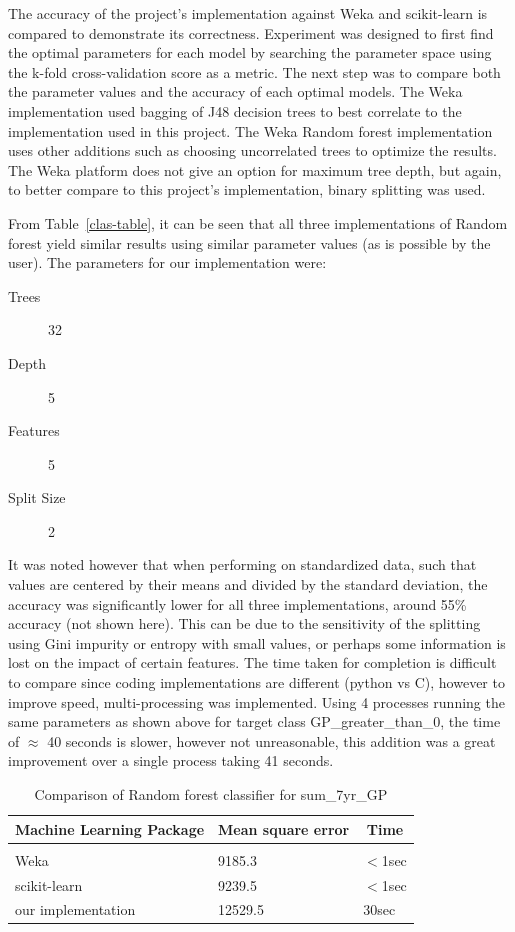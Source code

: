\documentclass{article} %
\begin{document}
The accuracy of the project’s implementation against Weka and scikit-learn is compared to demonstrate
its correctness. Experiment was designed to first find the optimal parameters for each model
by searching the parameter space using the k-fold cross-validation score as a metric. The next step
was to compare both the parameter values and the accuracy of each optimal models. The Weka implementation used bagging of J48 decision trees to best correlate to the implementation used in this project. The Weka Random forest implementation uses other additions such as choosing uncorrelated trees to optimize the results. The Weka platform does not give an option for maximum tree depth, but again, to better compare to this project's implementation, binary splitting was used. 

From Table~\ref{clas-table}, it can be seen that all three implementations of Random forest yield similar results using similar parameter values (as is possible by the user). The parameters for our implementation were:
\begin{description}
\item [Trees] 32
\item [Depth] 5
\item [Features] 5
\item [Split Size] 2
\end{description} 
It was noted however that when performing on standardized data, such that values are centered by their means and divided by the standard deviation, the accuracy was significantly lower for all three implementations, around 55\% accuracy (not shown here). This can be due to the sensitivity of the splitting using Gini impurity or entropy with small values, or perhaps some information is lost on the impact of certain features. The time taken for completion is difficult to compare since coding implementations are different (python vs C), however to improve speed, multi-processing was implemented. Using 4 processes running the same parameters as shown above for target class GP\_greater\_than\_0, the time of $\approx$ 40 seconds is slower, however not unreasonable, this addition was a great improvement over a single process taking 41 seconds.

\begin{table}[h]
\caption{Comparison of Random forest classifier for sum\_7yr\_GP}
\label{reg-table}
\begin{center}
\begin{tabular}{lll}
\multicolumn{1}{c}{\bf Machine Learning Package} &\multicolumn{1}{c}{\bf Mean square error} &\multicolumn{1}{c}{\bf Time}
\\ \hline \\
Weka         &9185.3	&$<$1sec \\
scikit-learn             &9239.5	&$<$1sec \\
our implementation             &12529.5	&30sec \\
\end{tabular}
\end{center}
\end{table}
\end{document}
